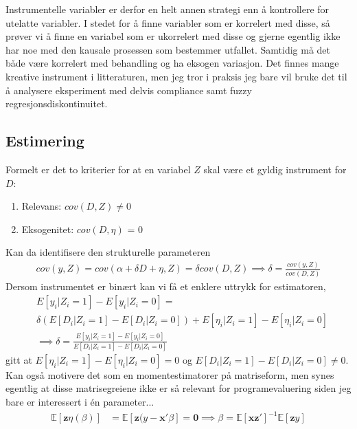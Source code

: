Instrumentelle variabler er derfor en helt annen strategi enn å kontrollere for utelatte variabler. I stedet for å finne variabler som er korrelert med disse, så prøver vi å finne en variabel som er ukorrelert med disse og gjerne egentlig ikke har noe med den kausale prosessen som bestemmer utfallet. Samtidig må det både være korrelert med behandling og ha eksogen variasjon. Det finnes mange kreative instrument i litteraturen, men jeg tror i praksis jeg bare vil bruke det til å analysere eksperiment med delvis compliance samt fuzzy regresjonsdiskontinuitet. 
\subsection{Estimering}
Formelt er det to kriterier for at en variabel $Z$ skal være et gyldig instrument for $D$:
\begin{enumerate}
\item Relevans: $cov(D,Z) \neq 0$
\item Eksogenitet: $cov(D,\eta)$ = 0
\end{enumerate}
Kan da identifisere den strukturelle parameteren
\begin{align}
cov(y,Z) = cov(\alpha + \delta D + \eta,Z) = \delta cov(D,Z) \implies \delta = \frac{cov(y,Z)}{cov(D,Z)}
\end{align}
Dersom instrumentet er binært kan vi få et enklere uttrykk for estimatoren,
\begin{align}
&E[y_i|Z_i=1]-E[y_i|Z_i=0] =\\
& \delta (E[ D_i|Z_i=1]-E[ D_i|Z_i=0]) + E[\eta_i|Z_i=1]-E[\eta_i|Z_i=0] \\
&\implies \delta = \frac{E[y_i|Z_i=1]-E[y_i|Z_i=0]}{E[D_i|Z_i=1]-E[D_i|Z_i=0]}
\end{align}
gitt at $E[\eta_i|Z_i=1]-E[\eta_i|Z_i=0]=0$ og $E[D_i|Z_i=1]-E[D_i|Z_i=0] \neq 0$. Kan også motivere det som en momentestimatorer på matriseform, men synes egentlig at disse matrisegreiene ikke er så relevant for programevaluering siden jeg bare er interessert i én parameter...
\begin{align}
\mathbb{E}[\mathbf{z}\eta(\beta)]&=\mathbb{E}[\mathbf{z}(y-\mathbf{x}'\beta] = \mathbf{0}
\implies \beta = \mathbb{E}[\mathbf{x}\mathbf{z}']^{-1}\mathbb{E}[\mathbf{z}y]
\end{align}
